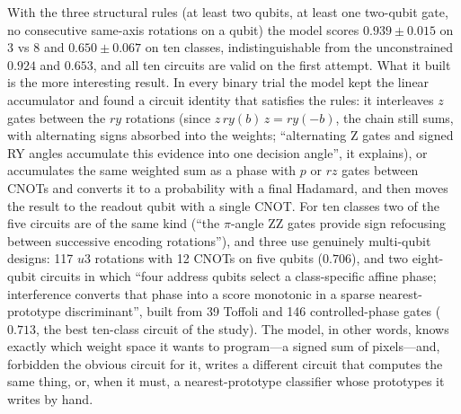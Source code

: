 With the three structural rules (at least two qubits, at least one two-qubit gate, no consecutive same-axis rotations on a qubit) the model scores $0.939 \pm 0.015$ on 3 vs 8 and $0.650 \pm 0.067$ on ten classes, indistinguishable from the unconstrained $0.924$ and $0.653$, and all ten circuits are valid on the first attempt. What it built is the more interesting result. In every binary trial the model kept the linear accumulator and found a circuit identity that satisfies the rules: it interleaves $z$ gates between the $ry$ rotations (since $z\,ry(b)\,z = ry(-b)$, the chain still sums, with alternating signs absorbed into the weights; ``alternating Z gates and signed RY angles accumulate this evidence into one decision angle'', it explains), or accumulates the same weighted sum as a phase with $p$ or $rz$ gates between CNOTs and converts it to a probability with a final Hadamard, and then moves the result to the readout qubit with a single CNOT. For ten classes two of the five circuits are of the same kind (``the $\pi$-angle ZZ gates provide sign refocusing between successive encoding rotations''), and three use genuinely multi-qubit designs: 117 $u3$ rotations with 12 CNOTs on five qubits ($0.706$), and two eight-qubit circuits in which ``four address qubits select a class-specific affine phase; interference converts that phase into a score monotonic in a sparse nearest-prototype discriminant'', built from 39 Toffoli and 146 controlled-phase gates ($0.713$, the best ten-class circuit of the study). The model, in other words, knows exactly which weight space it wants to program---a signed sum of pixels---and, forbidden the obvious circuit for it, writes a different circuit that computes the same thing, or, when it must, a nearest-prototype classifier whose prototypes it writes by hand.
